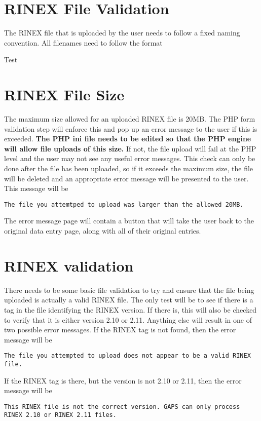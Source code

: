 \documentclass{report}
\begin{document}
\section{RINEX File Validation}
\par The RINEX file that is uploaded by the user needs to follow a fixed naming convention. All filenames need to follow the format
\par Test

\section{RINEX File Size}
\par The maximum size allowed for an uploaded RINEX file is 20MB. The PHP form validation step will enforce this and pop up an error message to the user if this is exceeded. \textbf{The PHP ini file needs to be edited so that the PHP engine will allow file uploads of this size.} If not, the file upload will fail at the PHP level and the user may not see any useful error messages. This check can only be done after the file has been uploaded, so if it exceeds the maximum size, the file will be deleted and an appropriate error message will be presented to the user. This message will be
\begin{verbatim}The file you attemtped to upload was larger than the allowed 20MB.\end{verbatim}
The error message page will contain a button that will take the user back to the original data entry page, along with all of their original entries.

\section{RINEX validation}
\par There needs to be some basic file validation to try and ensure that the file being uploaded is actually a valid RINEX file. The only test will be to see if there is a tag in the file identifying the RINEX version. If there is, this will also be checked to verify that it is either version 2.10 or 2.11. Anything else will result in one of two possible error messages. If the RINEX tag is not found, then the error message will be
\begin{verbatim}The file you attempted to upload does not appear to be a valid RINEX file.\end{verbatim}
If the RINEX tag is there, but the version is not 2.10 or 2.11, then the error message will be
\begin{verbatim}This RINEX file is not the correct version. GAPS can only process RINEX 2.10 or RINEX 2.11 files.\end{verbatim}
\end{document}
